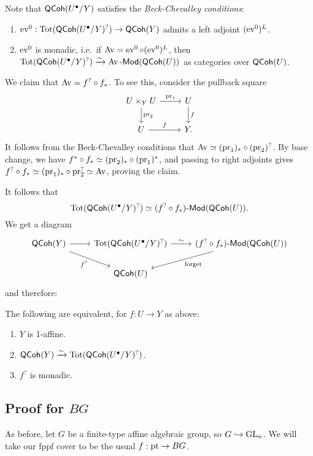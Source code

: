 \documentclass{article}
\begin{document}
Note that $\mathsf{QCoh}(U^\bullet / Y)$ satisfies the \emph{Beck-Chevalley conditions}:
\begin{enumerate}
	\item $\operatorname{ev}^0: \operatorname{Tot}(\mathsf{QCoh}(U^\bullet / Y)^?) \to \mathsf{QCoh}(Y)$ admits a left adjoint $(\operatorname{ev}^0)^L$.
	\item $\operatorname{ev}^0$ is monadic, i.e.\ if $\operatorname{Av} = \operatorname{ev}^0 \circ (\operatorname{ev}^0)^L$, then $\operatorname{Tot}(\mathsf{QCoh}(U^\bullet / Y)^?) \xrightarrow{\sim} \operatorname{Av}\text{-}\mathsf{Mod}(\mathsf{QCoh}(U))$ as categories over $\mathsf{QCoh}(U)$.
\end{enumerate}

We claim that $\operatorname{Av} = f^? \circ f_*$.
To see this, consider the pullback square
\[
	\begin{tikzcd}
		U \times_Y U \rar["\pr_1"] \dar["\pr_2"] & U \dar["f"] \\
		U \rar["f"] & Y.
	\end{tikzcd}
\]
It follows from the Beck-Chevalley conditions that $\operatorname{Av} \simeq (\operatorname{pr}_1)_* \circ (\operatorname{pr}_2)^?$.
By base change, we have $f^* \circ f_* \simeq (\operatorname{pr}_2)_* \circ (\operatorname{pr}_1)^*$, and passing to right adjoints gives $f^? \circ f_* \simeq (\operatorname{pr}_1)_* \circ \operatorname{pr}_2^? \simeq \operatorname{Av}$, proving the claim.

It follows that
\[
	\operatorname{Tot}(\mathsf{QCoh}(U^\bullet / Y)^?) \simeq (f^? \circ f_*)\text{-}\mathsf{Mod}(\mathsf{QCoh}(U)).
\]
We get a diagram
\[
	\begin{tikzcd}
		\QCoh(Y) \ar[dr, "f^?", swap] \ar[r] & \Tot(\QCoh(U^\bullet / Y)^?) \rar["\sim"] & {(f^? \circ f_*)\dMod(\QCoh(U))} \ar[dl, "\textrm{forget}"] \\
		& \QCoh(U) & 
	\end{tikzcd}
\]
and therefore:

\begin{thm}
	The following are equivalent, for $f: U \to Y$ as above:
	\begin{enumerate}
		\item $Y$ is 1-affine.
		\item $\mathsf{QCoh}(Y) \xrightarrow{\sim} \operatorname{Tot}(\mathsf{QCoh}(U^\bullet / Y)^?)$.
		\item $f^?$ is monadic.
	\end{enumerate}
\end{thm}

\subsection{Proof for $BG$}

As before, let $G$ be a finite-type affine algebraic group, so $G \hookrightarrow \operatorname{GL}_n$.
We will take our fppf cover to be the usual $f: \operatorname{pt} \to BG$.
\end{document}
